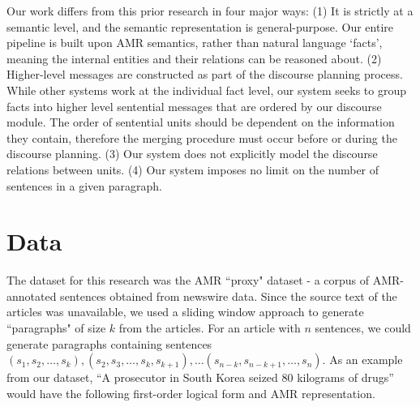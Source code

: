 \documentclass[12pt]{article}
\begin{document}
Our work differs from this prior research in four major ways: (1) It is strictly at a semantic level, and the semantic representation is general-purpose. Our entire pipeline is built upon AMR semantics, rather than natural language `facts', meaning the internal entities and their relations can be reasoned about. (2) Higher-level messages are constructed as part of the discourse planning process. While other systems work at the individual fact level, our system seeks to group facts into higher level sentential messages that are ordered by our discourse module. The order of sentential units should be dependent on the information they contain, therefore the merging procedure must occur before or during the discourse planning. (3) Our system does not explicitly model the discourse relations between units. (4) Our system imposes no limit on the number of sentences in a given paragraph.

\section{Data}

The dataset for this research was the AMR ``proxy" dataset - a corpus of
AMR-annotated sentences obtained from newswire data. Since the source text of
the articles was unavailable, we used a sliding window approach to generate
``paragraphs" of size $k$ from the articles. For an article with $n$ sentences,
we could generate paragraphs containing sentences $(s_1,s_2,\ldots,s_k),
(s_2,s_3,\ldots,s_k,s_{k+1}), \ldots (s_{n-k},s_{n-k+1},\ldots,s_n)$.
As an example from our dataset, ``A prosecutor in South Korea seized 80
kilograms of drugs'' would have the following first-order logical form and AMR
representation.\\
\end{document}
